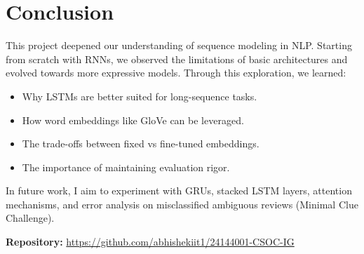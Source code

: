\documentclass[12pt]{article}
\begin{document}
\section{Conclusion}
This project deepened our understanding of sequence modeling in NLP. Starting from scratch with RNNs, we observed the limitations of basic architectures and evolved towards more expressive models. Through this exploration, we learned:

\begin{itemize}
    \item Why LSTMs are better suited for long-sequence tasks.
    \item How word embeddings like GloVe can be leveraged.
    \item The trade-offs between fixed vs fine-tuned embeddings.
    \item The importance of maintaining evaluation rigor.
\end{itemize}

In future work, I aim to experiment with GRUs, stacked LSTM layers, attention mechanisms, and error analysis on misclassified ambiguous reviews (Minimal Clue Challenge).

\vspace{1em}
\noindent\textbf{Repository:} \href{https://github.com/abhishekiit1/24144001-CSOC-IG}{https://github.com/abhishekiit1/24144001-CSOC-IG}
\end{document}

